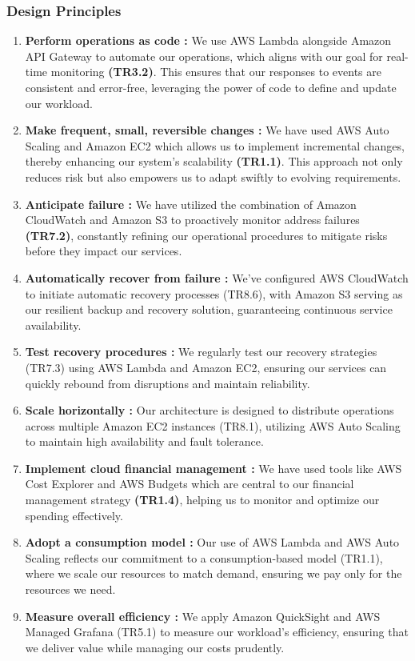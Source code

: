 \documentclass{article}
\begin{document}
\subsubsection{Design Principles}
\begin{enumerate}
    \item \textbf{Perform operations as code \cite{Opex}:} We use AWS Lambda alongside Amazon API Gateway to automate our operations, which aligns with our goal for real-time monitoring \textbf{(TR3.2)}. This ensures that our responses to events are consistent and error-free, leveraging the power of code to define and update our workload.
    \item \textbf{Make frequent, small, reversible changes \cite{Opex}:} We have  used AWS Auto Scaling and Amazon EC2 which allows us to implement incremental changes, thereby enhancing our system's scalability \textbf{(TR1.1)}. This approach not only reduces risk but also empowers us to adapt swiftly to evolving requirements.
    \item \textbf{Anticipate failure \cite{Opex}:} We have utilized the combination of Amazon CloudWatch and Amazon S3 to proactively monitor address failures \textbf{(TR7.2)}, constantly refining our operational procedures to mitigate risks before they impact our services.
    \item \textbf{Automatically recover from failure \cite{rel}:} We've configured AWS CloudWatch to initiate automatic recovery processes (TR8.6), with Amazon S3 serving as our resilient backup and recovery solution, guaranteeing continuous service availability.
    \item \textbf{Test recovery procedures \cite{rel}:} We regularly test our recovery strategies (TR7.3) using AWS Lambda and Amazon EC2, ensuring our services can quickly rebound from disruptions and maintain reliability.
    \item \textbf{Scale horizontally \cite{rel}:} Our architecture is designed to distribute operations across multiple Amazon EC2 instances (TR8.1), utilizing AWS Auto Scaling to maintain high availability and fault tolerance.
    \item \textbf{Implement cloud financial management \cite{Cost dp}:} We have used tools like AWS Cost Explorer and AWS Budgets which are central to our financial management strategy \textbf{(TR1.4)}, helping us to monitor and optimize our spending effectively.
    \item \textbf{Adopt a consumption model \cite{Cost dp}:} Our use of AWS Lambda and AWS Auto Scaling reflects our commitment to a consumption-based model (TR1.1), where we scale our resources to match demand, ensuring we pay only for the resources we need.
    \item \textbf{Measure overall efficiency \cite{Cost dp}:} We apply Amazon QuickSight and AWS Managed Grafana (TR5.1) to measure our workload's efficiency, ensuring that we deliver value while managing our costs prudently.

\end{enumerate}
\end{document}
